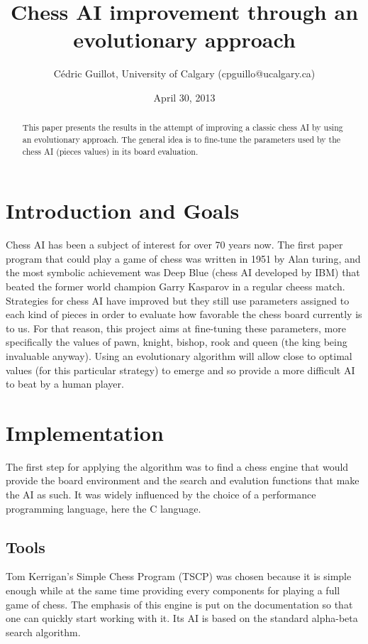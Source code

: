 \documentclass[a4paper,12pt,twocolumn]{article}
\title{Chess AI improvement through an evolutionary approach}
\author{Cédric Guillot, University of Calgary (cpguillo@ucalgary.ca)}
\date{April 30, 2013}
\begin{document}
\maketitle

\begin{abstract}
This paper presents the results in the attempt of improving a classic chess AI by using an evolutionary approach. The general idea is to fine-tune the parameters used by the chess AI (pieces values) in its board evaluation.
\end{abstract}

\section{Introduction and Goals}
Chess AI has been a subject of interest for over 70 years now. The first paper program that could play a game of chess was written in 1951 by Alan turing, and the most symbolic achievement was Deep Blue (chess AI developed by IBM) that beated the former world champion Garry Kasparov in a regular cheess match.\\
Strategies for chess AI have improved but they still use parameters assigned to each kind of pieces in order to evaluate how favorable the chess board currently is to us. For that reason, this project aims at fine-tuning these parameters, more specifically the values of pawn, knight, bishop, rook and queen (the king being invaluable anyway). Using an evolutionary algorithm will allow close to optimal values (for this particular strategy) to emerge and so provide a more difficult AI to beat by a human player.

\section{Implementation}
The first step for applying the algorithm was to find a chess engine that would provide the board environment and the search and evalution functions that make the AI as such. It was widely influenced by the choice of a performance programming language, here the C language.

\subsection{Tools}
Tom Kerrigan’s Simple Chess Program (TSCP) was chosen because it is simple enough while at the same time providing every components for playing a full game of chess. The emphasis of this engine is put on the documentation so that one can quickly start working with it. Its AI is based on the standard alpha-beta search algorithm.\\
\end{document}

